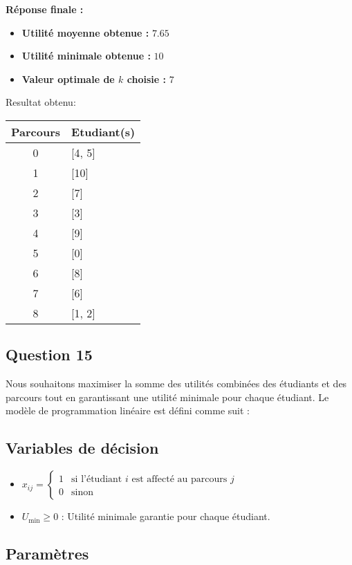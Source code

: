 \documentclass[a4paper,11pt]{article}
\begin{document}
\textbf{Réponse finale :}
\begin{itemize}
    \item \textbf{Utilité moyenne obtenue :} \( 7.65 \)
    \item \textbf{Utilité minimale obtenue :} \( 10 \)
    \item \textbf{Valeur optimale de \( k \) choisie :} \( 7 \)
\end{itemize}

Resultat obtenu:
\begin{tabular}{|c|l|}
\hline
Parcours & Etudiant(s) \\
\hline
0 & [4, 5] \\
\hline
1 & [10] \\
\hline
2 & [7] \\
\hline
3 & [3] \\
\hline
4 & [9] \\
\hline
5 & [0] \\
\hline
6 & [8] \\
\hline
7 & [6] \\
\hline
8 & [1, 2] \\
\hline
\end{tabular}

\subsection*{Question 15}

Nous souhaitons maximiser la somme des utilités combinées des étudiants et des parcours tout en garantissant une utilité minimale pour chaque étudiant. Le modèle de programmation linéaire est défini comme suit :

\subsection*{Variables de décision}

\begin{itemize}
    \item $x_{ij} = 
        \begin{cases} 
            1 & \text{si l'étudiant } i \text{ est affecté au parcours } j \\
            0 & \text{sinon}
        \end{cases}$
    \item $U_{\min} \geq 0$ : Utilité minimale garantie pour chaque étudiant.
\end{itemize}

\subsection*{Paramètres}
\end{document}
